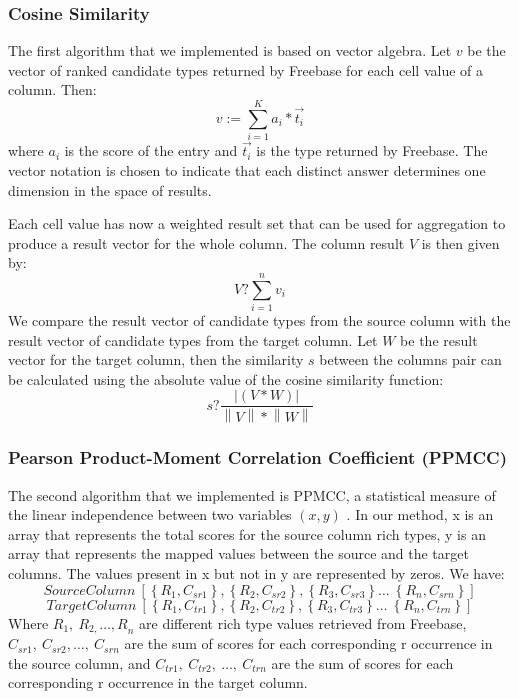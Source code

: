 \documentclass{sig-alternate}
\begin{document}
\subsubsection{Cosine Similarity}
The first algorithm that we implemented is based on vector algebra. Let $v$ be the vector of ranked candidate types returned by Freebase for each cell value of a column. Then:
\[v:=\sum^K_{i=1}{a_i}*\overrightarrow{t_i}\] 
where $a_i$ is the score of the entry and $\overrightarrow{t_i}$ is the type returned by Freebase. The vector notation is chosen to indicate that each distinct answer determines one dimension in the space of results. 

Each cell value has now a weighted result set that can be used for aggregation to produce a result vector for the whole column. The column result $V$ is then given by:
\[V?\sum^n_{i=1}{v_i}\] 
We compare the result vector of candidate types from the source column with the result vector of candidate types from the target column. Let $W$ be the result vector for the target column, then the similarity $s$ between the columns pair can be calculated using the absolute value of the cosine similarity function: 
\[s?\frac{\left|(V*W)\right|}{\left\|V\right\|*\left\|W\right\|}\] 


\subsubsection{Pearson Product-Moment Correlation Coefficient (PPMCC)}

The second algorithm that we implemented is PPMCC, a statistical measure of the linear independence between two variables $\left(x,y\right)$ \cite{citeulike:8051946}. In our method, x is an array that represents the total scores for the source column rich types, y is an array that represents the mapped values between the source and the target columns. The values present in x but not in y are represented by zeros. We have:
\[SourceColumn\ \left[\left\{R_1,C_{sr1}\right\},\left\{R_2,C_{sr2}\right\},\left\{R_3,C_{sr3}\right\}\dots \ \left\{R_n,C_{srn}\right\}\right]\] 
\[TargetColumn\ \left[\left\{R_1,C_{tr1}\right\},\left\{R_2,C_{tr2}\right\},\left\{R_3,C_{tr3}\right\}\dots \ \left\{R_n,C_{trn}\right\}\right]\] 
Where $R_1,\ R_{2,}{\dots ,R}_n$ are different rich type values retrieved from Freebase, $C_{sr1},\ C_{sr2},\dots ,\ C_{srn}$ are the sum of scores for each corresponding r occurrence in the source column, and $C_{tr1},\ C_{tr2},\ \dots ,\ C_{trn}$ are the sum of scores for each corresponding r occurrence in the target column. 
\end{document}

